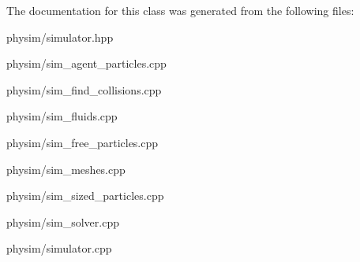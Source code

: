 The documentation for this class was generated from the following files\+:\begin{DoxyCompactItemize}
\item 
physim/simulator.\+hpp\item 
physim/sim\+\_\+agent\+\_\+particles.\+cpp\item 
physim/sim\+\_\+find\+\_\+collisions.\+cpp\item 
physim/sim\+\_\+fluids.\+cpp\item 
physim/sim\+\_\+free\+\_\+particles.\+cpp\item 
physim/sim\+\_\+meshes.\+cpp\item 
physim/sim\+\_\+sized\+\_\+particles.\+cpp\item 
physim/sim\+\_\+solver.\+cpp\item 
physim/simulator.\+cpp\end{DoxyCompactItemize}
